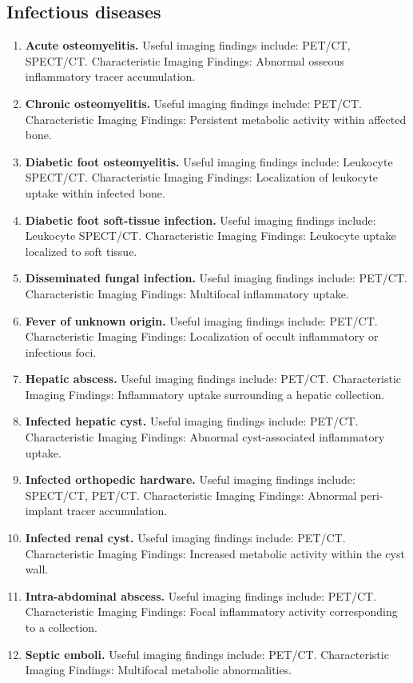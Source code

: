\subsection{Infectious diseases}
\begin{enumerate}[leftmargin=*,itemsep=0.45em,topsep=0.4em]
\item \textbf{Acute osteomyelitis.} Useful imaging findings include: PET/CT, SPECT/CT. Characteristic Imaging Findings: Abnormal osseous inflammatory tracer accumulation.
\item \textbf{Chronic osteomyelitis.} Useful imaging findings include: PET/CT. Characteristic Imaging Findings: Persistent metabolic activity within affected bone.
\item \textbf{Diabetic foot osteomyelitis.} Useful imaging findings include: Leukocyte SPECT/CT. Characteristic Imaging Findings: Localization of leukocyte uptake within infected bone.
\item \textbf{Diabetic foot soft-tissue infection.} Useful imaging findings include: Leukocyte SPECT/CT. Characteristic Imaging Findings: Leukocyte uptake localized to soft tissue.
\item \textbf{Disseminated fungal infection.} Useful imaging findings include: PET/CT. Characteristic Imaging Findings: Multifocal inflammatory uptake.
\item \textbf{Fever of unknown origin.} Useful imaging findings include: PET/CT. Characteristic Imaging Findings: Localization of occult inflammatory or infectious foci.
\item \textbf{Hepatic abscess.} Useful imaging findings include: PET/CT. Characteristic Imaging Findings: Inflammatory uptake surrounding a hepatic collection.
\item \textbf{Infected hepatic cyst.} Useful imaging findings include: PET/CT. Characteristic Imaging Findings: Abnormal cyst-associated inflammatory uptake.
\item \textbf{Infected orthopedic hardware.} Useful imaging findings include: SPECT/CT, PET/CT. Characteristic Imaging Findings: Abnormal peri-implant tracer accumulation.
\item \textbf{Infected renal cyst.} Useful imaging findings include: PET/CT. Characteristic Imaging Findings: Increased metabolic activity within the cyst wall.
\item \textbf{Intra-abdominal abscess.} Useful imaging findings include: PET/CT. Characteristic Imaging Findings: Focal inflammatory activity corresponding to a collection.
\item \textbf{Septic emboli.} Useful imaging findings include: PET/CT. Characteristic Imaging Findings: Multifocal metabolic abnormalities.

\end{enumerate}
